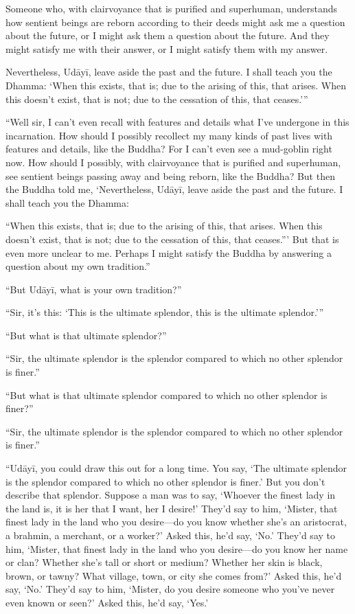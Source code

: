 \documentclass[12pt,openany]{book}%
\begin{document}
Someone who, with clairvoyance that is purified and superhuman, understands how sentient beings are reborn according to their deeds might ask me a question about the future, or I might ask them a question about the future. And they might satisfy me with their answer, or I might satisfy them with my answer. 

Nevertheless, \textsanskrit{Udāyī}, leave aside the past and the future. I shall teach you the Dhamma: ‘When this exists, that is; due to the arising of this, that arises. When this doesn’t exist, that is not; due to the cessation of this, that ceases.’” 

“Well sir, I can’t even recall with features and details what I’ve undergone in this incarnation. How should I possibly recollect my many kinds of past lives with features and details, like the Buddha? For I can’t even see a mud-goblin right now. How should I possibly, with clairvoyance that is purified and superhuman, see sentient beings passing away and being reborn, like the Buddha? But then the Buddha told me, ‘Nevertheless, \textsanskrit{Udāyī}, leave aside the past and the future. I shall teach you the Dhamma: 

“When this exists, that is; due to the arising of this, that arises. When this doesn’t exist, that is not; due to the cessation of this, that ceases.”’ But that is even more unclear to me. Perhaps I might satisfy the Buddha by answering a question about my own tradition.” 

“But \textsanskrit{Udāyī}, what is your own tradition?” 

“Sir, it’s this: ‘This is the ultimate splendor, this is the ultimate splendor.’” 

“But what is that ultimate splendor?” 

“Sir, the ultimate splendor is the splendor compared to which no other splendor is finer.” 

“But what is that ultimate splendor compared to which no other splendor is finer?” 

“Sir, the ultimate splendor is the splendor compared to which no other splendor is finer.” 

“\textsanskrit{Udāyī}, you could draw this out for a long time. You say, ‘The ultimate splendor is the splendor compared to which no other splendor is finer.’ But you don’t describe that splendor. Suppose a man was to say, ‘Whoever the finest lady in the land is, it is her that I want, her I desire!’ They’d say to him, ‘Mister, that finest lady in the land who you desire—do you know whether she’s an aristocrat, a brahmin, a merchant, or a worker?’ Asked this, he’d say, ‘No.’ They’d say to him, ‘Mister, that finest lady in the land who you desire—do you know her name or clan? Whether she’s tall or short or medium? Whether her skin is black, brown, or tawny? What village, town, or city she comes from?’ Asked this, he’d say, ‘No.’ They’d say to him, ‘Mister, do you desire someone who you’ve never even known or seen?’ Asked this, he’d say, ‘Yes.’ 
\end{document}
